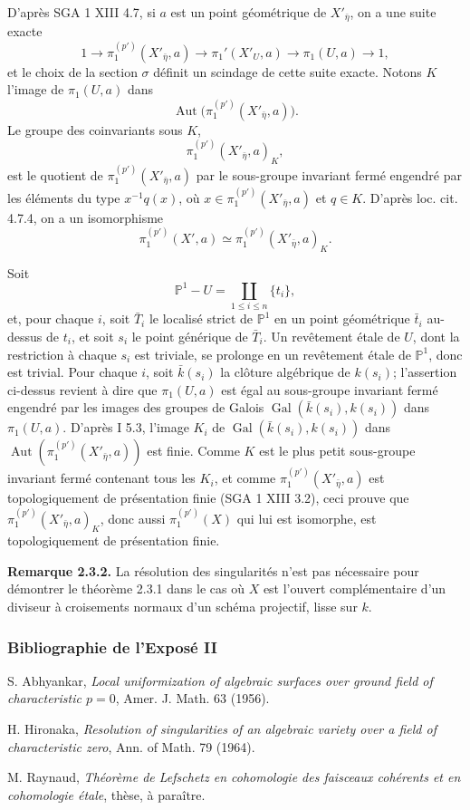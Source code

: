 \documentclass[11pt]{article}
\providecommand{\Gal}{\operatorname{Gal}}
\providecommand{\Aut}{\operatorname{Aut}}
\begin{document}
D'après SGA 1 XIII 4.7, si $a$ est un point géométrique de $X'_{\bar\eta}$, on a une suite exacte
\[
1\longrightarrow \pi_1^{(p')}(X'_{\bar\eta},a)
\longrightarrow \pi_1'(X'_U,a)
\longrightarrow \pi_1(U,a)
\longrightarrow 1,
\]
et le choix de la section $\sigma$ définit un scindage de cette suite exacte. Notons $K$ l'image de $\pi_1(U,a)$ dans
\[
 \Aut\bigl(\pi_1^{(p')}(X'_{\bar\eta},a)\bigr).
\]
Le groupe des coinvariants sous $K$,
\[
 \pi_1^{(p')}(X'_{\bar\eta},a)_K,
\]
est le quotient de $\pi_1^{(p')}(X'_{\bar\eta},a)$ par le sous-groupe invariant fermé engendré par les éléments du type $x^{-1}q(x)$, où $x\in\pi_1^{(p')}(X'_{\bar\eta},a)$ et $q\in K$. D'après loc. cit. 4.7.4, on a un isomorphisme
\[
 \pi_1^{(p')}(X',a)\simeq \pi_1^{(p')}(X'_{\bar\eta},a)_K.
\]

Soit
\[
 \mathbb P^1-U=\coprod_{1\le i\le n}\{t_i\},
\]
et, pour chaque $i$, soit $\bar T_i$ le localisé strict de $\mathbb P^1$ en un point géométrique $\bar t_i$ au-dessus de $t_i$, et soit $s_i$ le point générique de $\bar T_i$. Un revêtement étale de $U$, dont la restriction à chaque $s_i$ est triviale, se prolonge en un revêtement étale de $\mathbb P^1$, donc est trivial. Pour chaque $i$, soit $\bar k(s_i)$ la clôture algébrique de $k(s_i)$; l'assertion ci-dessus revient à dire que $\pi_1(U,a)$ est égal au sous-groupe invariant fermé engendré par les images des groupes de Galois $\Gal(\bar k(s_i),k(s_i))$ dans $\pi_1(U,a)$. D'après I 5.3, l'image $K_i$ de $\Gal(\bar k(s_i),k(s_i))$ dans $\Aut(\pi_1^{(p')}(X'_{\bar\eta},a))$ est finie. Comme $K$ est le plus petit sous-groupe invariant fermé contenant tous les $K_i$, et comme $\pi_1^{(p')}(X'_{\bar\eta},a)$ est topologiquement de présentation finie (SGA 1 XIII 3.2), ceci prouve que $\pi_1^{(p')}(X'_{\bar\eta},a)_K$, donc aussi $\pi_1^{(p')}(X)$ qui lui est isomorphe, est topologiquement de présentation finie.

\textbf{Remarque 2.3.2.} La résolution des singularités n'est pas nécessaire pour démontrer le théorème 2.3.1 dans le cas où $X$ est l'ouvert complémentaire d'un diviseur à croisements normaux d'un schéma projectif, lisse sur $k$.

\subsubsection*{Bibliographie de l'Exposé II}
\begin{enumerate}[label={[\arabic*]}]
\item S. Abhyankar, \emph{Local uniformization of algebraic surfaces over ground field of characteristic $p=0$}, Amer. J. Math. 63 (1956).
\item H. Hironaka, \emph{Resolution of singularities of an algebraic variety over a field of characteristic zero}, Ann. of Math. 79 (1964).
\item M. Raynaud, \emph{Théorème de Lefschetz en cohomologie des faisceaux cohérents et en cohomologie étale}, thèse, à paraître.
\end{enumerate}
\end{document}
